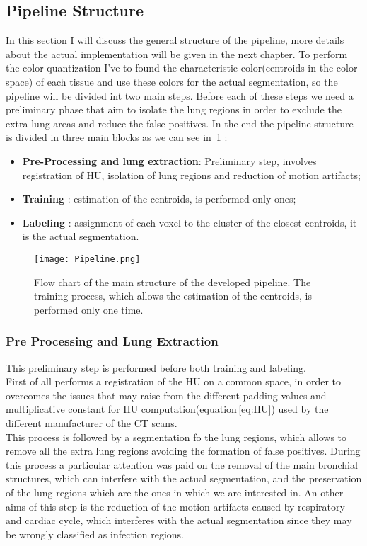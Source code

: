 \documentclass{standalone}
\begin{document}
	\subsection{Pipeline Structure}
	
	In this section I will discuss the general structure of the pipeline, more details about the actual implementation will be given in the next chapter.
	To perform the color quantization I've to found the characteristic color(centroids in the color space) of each tissue and use these colors for the actual segmentation, so the pipeline will be divided int two main steps. Before each of these steps we need a preliminary phase that aim to isolate the lung regions in order to exclude the extra lung areas and reduce the false positives.
	In the end the pipeline structure is divided in three main blocks as we can see in \figurename\,\ref{fig:Pipeline} : 
	\begin{itemize}
		\item \textbf{Pre-Processing and lung extraction}: Preliminary step, involves registration of HU, isolation of lung regions and reduction of motion artifacts;
		\item \textbf{Training} : estimation of the centroids, is performed only ones; 
		
		\item \textbf{Labeling} :  assignment of each voxel to the cluster of the closest centroids, it is the actual segmentation.
	\end{itemize}
	
		
	\begin{figure}[h!]
		\centering 
			\texttt{[image: Pipeline.png]}
		\label{fig:Pipeline}\caption{Flow chart of the main structure of the developed pipeline. The training process, which allows the estimation of the centroids, is performed only one time.}
	\end{figure} 
	
	\subsubsection*{Pre Processing and Lung Extraction}
	
	This preliminary step is performed before both training and labeling.\\
	First of all performs a registration of the HU on a common space, in order to overcomes the issues that may raise from the different padding values and multiplicative constant for HU computation(equation\,\ref{eq:HU}) used by the different manufacturer of the CT scans.\\
	This process is followed by a segmentation fo the lung regions, which allows to remove all the extra lung regions avoiding the formation of false positives. During this process a particular attention was paid on the removal of the main bronchial structures, which can interfere with the actual segmentation, and the preservation of the lung regions which are the ones in which we are interested in. An other aims of this step is the reduction of the motion artifacts caused by respiratory and cardiac cycle, which interferes with the actual segmentation since they may be wrongly classified as infection regions.
	
\end{document}

